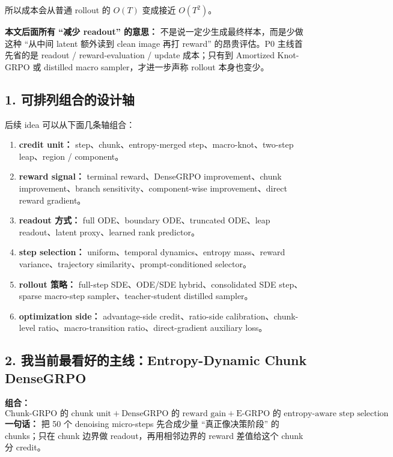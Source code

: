 所以成本会从普通 rollout 的 \(O(T)\) 变成接近 \(O(T^2)\)。

\begin{summarybox}
\textbf{本文后面所有 ``减少 readout'' 的意思：} 不是说一定少生成最终样本，而是少做这种 ``从中间 latent 额外读到 clean image 再打 reward'' 的昂贵评估。P0 主线首先省的是 readout / reward-evaluation / update 成本；只有到 Amortized Knot-GRPO 或 distilled macro sampler，才进一步声称 rollout 本身也变少。
\end{summarybox}

\subsection{1. 可排列组合的设计轴}

后续 idea 可以从下面几条轴组合：

\begin{enumerate}[leftmargin=1.5em]
  \item \textbf{credit unit：} step、chunk、entropy-merged step、macro-knot、two-step leap、region / component。
  \item \textbf{reward signal：} terminal reward、DenseGRPO improvement、chunk improvement、branch sensitivity、component-wise improvement、direct reward gradient。
  \item \textbf{readout 方式：} full ODE、boundary ODE、truncated ODE、leap readout、latent proxy、learned rank predictor。
  \item \textbf{step selection：} uniform、temporal dynamics、entropy mass、reward variance、trajectory similarity、prompt-conditioned selector。
  \item \textbf{rollout 策略：} full-step SDE、ODE/SDE hybrid、consolidated SDE step、sparse macro-step sampler、teacher-student distilled sampler。
  \item \textbf{optimization side：} advantage-side credit、ratio-side calibration、chunk-level ratio、macro-transition ratio、direct-gradient auxiliary loss。
\end{enumerate}

\subsection{2. 我当前最看好的主线：Entropy-Dynamic Chunk DenseGRPO}

\begin{conceptbox}
\textbf{组合：}
\[
\text{Chunk-GRPO 的 chunk unit}
+ \text{DenseGRPO 的 reward gain}
+ \text{E-GRPO 的 entropy-aware step selection}
\]
\textbf{一句话：} 把 50 个 denoising micro-steps 先合成少量 ``真正像决策阶段'' 的 chunks；只在 chunk 边界做 readout，再用相邻边界的 reward 差值给这个 chunk 分 credit。
\end{conceptbox}

